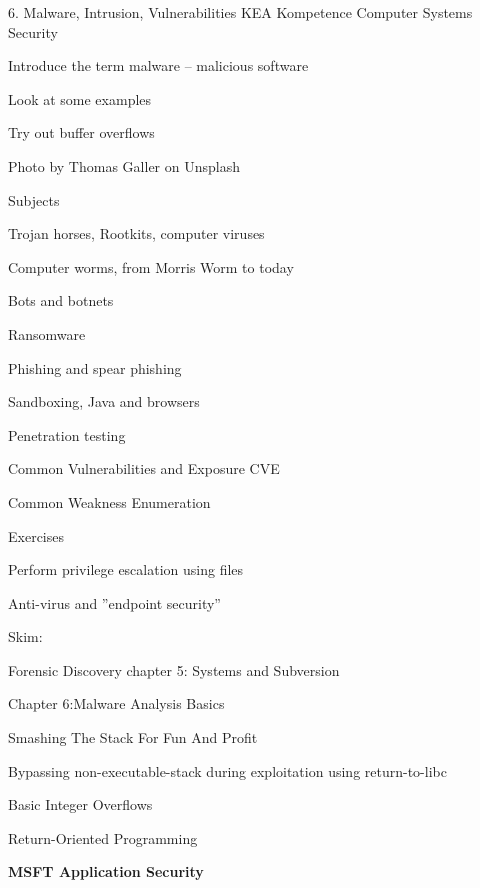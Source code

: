 \documentclass[Screen16to9,17pt]{foils}
\begin{document}
\mytitlepage
{6. Malware, Intrusion, Vulnerabilities}
{KEA Kompetence Computer Systems Security \the\year}



\begin{list2}
\item Introduce the term malware -- malicious software
\item Look at some examples
\item Try out buffer overflows
\end{list2}

{\small Photo by Thomas Galler on Unsplash}


\begin{list1}
\item Subjects
\begin{list2}
  \item Trojan horses, Rootkits, computer viruses
  \item Computer worms, from Morris Worm to today
  \item Bots and botnets
  \item Ransomware
  \item Phishing and spear phishing
  \item Sandboxing, Java and browsers
  \item Penetration testing
  \item Common Vulnerabilities and Exposure CVE
  \item Common Weakness Enumeration
\end{list2}
\item Exercises
\begin{list2}
\item Perform privilege escalation using files
\item Anti-virus and ”endpoint security”
\end{list2}
\end{list1}




Skim:
\begin{list1}
\item Forensic Discovery chapter 5: Systems and Subversion
\item Chapter 6:Malware Analysis Basics
\item Smashing The Stack For Fun And Profit
\item Bypassing non-executable-stack during exploitation using return-to-libc
\item Basic Integer Overflows
\item Return-Oriented Programming
\item {\bf MSFT Application Security}
\end{list1}
\end{document}
